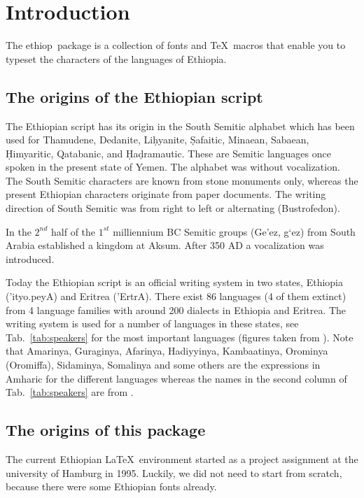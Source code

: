 \documentclass[a4paper]{article}
\newcommand{\eth}{\selectlanguage{ethiop}}
\newcommand*\ethioplogo{\textsf{ethiop}}
\begin{document}
\section{Introduction}

The \ethioplogo\ package \cite{BKKM97} is a collection of fonts
and \TeX\ macros that enable you to typeset the characters
of the languages of Ethiopia.

\subsection{The origins of the Ethiopian script}

The Ethiopian script has its origin in the South Semitic alphabet
which has been used for Thamudene, Dedanite, Li\d{h}yanite,
\d{S}afaitic, Minaean, Sabaean, \d{H}imyaritic, Qatabanic, and
\d{H}a\d{d}ramautic. These are Semitic languages once spoken
in the present state of Yemen. The alphabet was without vocalization.
The South Semitic characters are known from stone monuments only,
whereas the present Ethiopian characters originate from
paper documents. The writing direction of South Semitic was from
right to left or alternating (Bustrofedon).

In the $2^{nd}$ half of the $1^{st}$ milliennium BC Semitic groups
(Ge'ez, {\eth g`ez}) from South Arabia established a kingdom at Aksum.
After 350 AD a vocalization was introduced.

Today the Ethiopian script is an official writing system in two
states, Ethio\-pia ({\eth 'ityo.peyA}) and Eri\-trea ({\eth 'ErtrA}).
There exist 86 languages (4 of them extinct)
from 4 language families with around 200 dialects in Ethiopia and
Eritrea. The writing system is used for a number of languages
in these states, see Tab.~\ref{tab:speakers} for the most
important languages (figures taken from \cite{ethno96}).
Note that Amarinya, Guraginya, Afarinya,
Hadiyyinya, Kambaatinya, Orominya (O\-ro\-miffa),
Sidaminya, Somalinya and some others are the expressions in Amharic
for the different languages whereas the names in the second column of
Tab.~\ref{tab:speakers} are from \cite{ethno96}.

\subsection{The origins of this package}

The current Ethiopian \LaTeX\ environment started
as a project assignment at the university of Hamburg in
1995. Luckily, we did not need to start from scratch,
because there were some Ethiopian fonts already.
\end{document}
